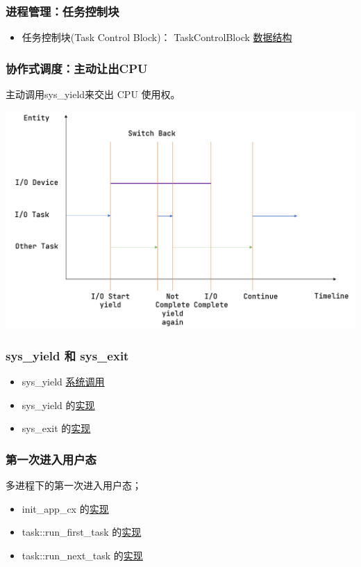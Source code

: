 \begin{frame}
    \frametitle{进程管理：任务控制块}
% 
\begin{itemize}
    \item 任务控制块(Task Control Block)： TaskControlBlock  \href{https://gitee.com/rcore-os/rCore-Tutorial-v3/blob/ch3-coop/os/src/task/task.rs\#L1}{数据结构}

\end{itemize}
\end{frame}
\begin{frame}
    \frametitle{协作式调度：主动让出CPU}
% 
主动调用sys\_yield来交出 CPU 使用权。

\includegraphics[width=0.7\linewidth]{figs/multiprogramming.png}
\end{frame}
\begin{frame}
    \frametitle{sys\_yield 和 sys\_exit}
% 
\begin{itemize}
    \item sys\_yield \href{https://gitee.com/rcore-os/rCore-Tutorial-v3/blob/ch3/user/src/syscall.rs\#L27}{系统调用}
    \item  sys\_yield 的\href{https://gitee.com/rcore-os/rCore-Tutorial-v3/blob/ch3/os/src/syscall/process.rs\#L13}{实现}
    \item  sys\_exit 的\href{https://gitee.com/rcore-os/rCore-Tutorial-v3/blob/ch3/os/src/syscall/process.rs\#L7}{实现}   
\end{itemize}
\end{frame}
\begin{frame}
    \frametitle{第一次进入用户态}
% 
多进程下的第一次进入用户态；
% 
\begin{itemize}
    \item init\_app\_cx 的\href{https://gitee.com/rcore-os/rCore-Tutorial-v3/blob/ch3/os/src/loader.rs\#L82}{实现}
    \item task::run\_first\_task 的\href{https://gitee.com/rcore-os/rCore-Tutorial-v3/blob/ch3/os/src/task/mod.rs\#L48}{实现}
    \item  task::run\_next\_task 的\href{https://gitee.com/rcore-os/rCore-Tutorial-v3/blob/ch3/os/src/task/mod.rs\#L82}{实现}
\end{itemize}
\end{frame}
